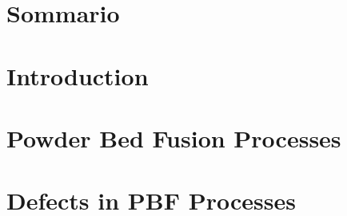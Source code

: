 \documentclass{Configuration_Files/PoliMi3i_thesis}
\begin{document}
\chapter*{Sommario}




\thispagestyle{empty}
\tableofcontents %
\thispagestyle{empty}
\cleardoublepage


\mainmatter %



\chapter{Introduction}
\label{ch:Introduction}%



\chapter{Powder Bed Fusion Processes}
\label{ch:Metal_AM}



\chapter{Defects in PBF Processes}
\label{ch:defects}

\end{document}
